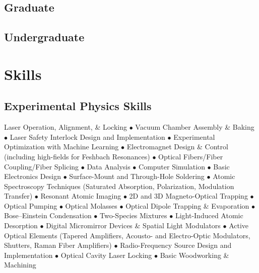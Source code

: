 \documentclass[12pt,letterpaper,sans]{moderncv}
\begin{document}
\subsection{Graduate}



\subsection{Undergraduate}




\section{Skills}
\subsection{Experimental Physics Skills}
Laser Operation, Alignment, \& Locking $\bullet$ Vacuum Chamber Assembly \& Baking $\bullet$ Laser Safety Interlock Design and Implementation $\bullet$ Experimental Optimization with Machine Learning $\bullet$ Electromagnet Design \& Control (including high-fields for Feshbach Resonances) $\bullet$ Optical Fibers/Fiber Coupling/Fiber Splicing $\bullet$ Data Analysis $\bullet$ Computer Simulation $\bullet$ Basic Electronics Design $\bullet$ Surface-Mount and Through-Hole Soldering $\bullet$ Atomic Spectroscopy Techniques (Saturated Absorption, Polarization, Modulation Transfer) $\bullet$ Resonant Atomic Imaging $\bullet$ 2D and 3D Magneto-Optical Trapping $\bullet$ Optical Pumping $\bullet$ Optical Molasses $\bullet$ Optical Dipole Trapping \& Evaporation $\bullet$ Bose--Einstein Condensation $\bullet$ Two-Species Mixtures $\bullet$ Light-Induced Atomic Desorption $\bullet$ Digital Micromirror Devices \& Spatial Light Modulators $\bullet$ Active Optical Elements (Tapered Amplifiers, Acousto- and Electro-Optic Modulators, Shutters, Raman Fiber Amplifiers) $\bullet$ Radio-Frequency Source Design and Implementation $\bullet$ Optical Cavity Laser Locking $\bullet$ Basic Woodworking \& Machining
\end{document}
